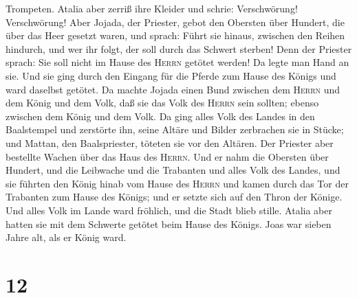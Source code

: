 Trompeten. Atalia aber zerriß ihre Kleider und schrie: Verschwörung!
Verschwörung!  Aber Jojada, der Priester, gebot den
Obersten über Hundert, die über das Heer gesetzt waren, und sprach:
Führt sie hinaus, zwischen den Reihen hindurch, und wer ihr folgt, der
soll durch das Schwert sterben! Denn der Priester sprach: Sie soll nicht
im Hause des \textsc{Herrn} getötet werden!  Da legte man
Hand an sie. Und sie ging durch den Eingang für die Pferde zum Hause des
Königs und ward daselbst getötet.  Da machte Jojada einen
Bund zwischen dem \textsc{Herrn} und dem König und dem Volk, daß sie das
Volk des \textsc{Herrn} sein sollten; ebenso zwischen dem König und dem
Volk.  Da ging alles Volk des Landes in den Baalstempel
und zerstörte ihn, seine Altäre und Bilder zerbrachen sie in Stücke; und
Mattan, den Baalspriester, töteten sie vor den Altären. 
Der Priester aber bestellte Wachen über das Haus des \textsc{Herrn}. Und
er nahm die Obersten über Hundert, und die Leibwache und die Trabanten
und alles Volk des Landes, und sie führten den König hinab vom Hause des
\textsc{Herrn} und kamen durch das Tor der Trabanten zum Hause des
Königs; und er setzte sich auf den Thron der Könige.  Und
alles Volk im Lande ward fröhlich, und die Stadt blieb stille. Atalia
aber hatten sie mit dem Schwerte getötet beim Hause des Königs.
 Joas war sieben Jahre alt, als er König ward.

\hypertarget{section-11}{%
\section{12}\label{section-11}}

